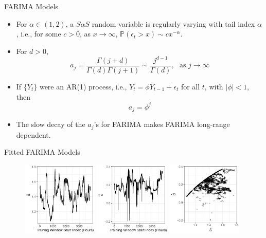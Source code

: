 \documentclass{beamer}
\def\P{\mathbb P}
\begin{document}
\begin{frame}{FARIMA Models}
    \begin{itemize}
        \item For $\alpha \in (1, 2)$, a $S\alpha S$ random variable is regularly varying with tail index $\alpha$, i.e., for some $c > 0$, as $x \to \infty$, $\P(\epsilon_t > x) \sim c x^{-\alpha}$.
        \item For $d > 0$,
        \[
        a_j = \frac{\Gamma(j + d)}{\Gamma(d)\Gamma(j + 1)} \sim \frac{j^{d - 1}}{\Gamma(d)}, \ \ \ \mbox{as $j \to \infty$}
        \]
        \item If $\{Y_t\}$ were an AR(1) process, i.e., $Y_t = \phi Y_{t - 1} + \epsilon_t$ for all $t$, with $|\phi| < 1$, then
        \[
        a_j = \phi^j
        \]
        \item The slow decay of the $a_j$'s for FARIMA makes FARIMA long-range dependent.
    \end{itemize}
\end{frame}

\begin{frame}{Fitted FARIMA Models}
    \begin{figure}[!htb]
    \centering
    \includegraphics[width=0.32\textwidth]{farima_alpha_estims.pdf}
    \includegraphics[width=0.32\textwidth]{farima_d_estims.pdf}
     \includegraphics[width=0.32\textwidth]{farima_alpha_d_estims.pdf}
    \label{fig:farima_param_estims}
    \end{figure}
\end{frame}
\end{document}
